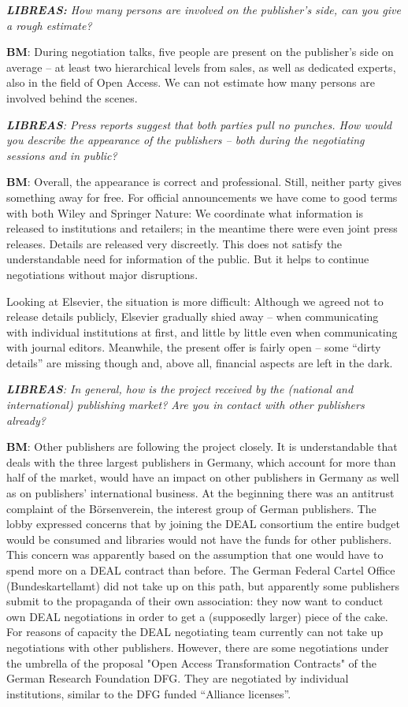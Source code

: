\documentclass[a4paper,
fontsize=11pt,
oneside,
numbers=noperiodatend,
parskip=half-,
bibliography=totoc,
final
]{scrartcl}
\begin{document}
\emph{\textbf{LIBREAS:} How many persons are involved on the publisher's
side, can you give a rough estimate?}

\textbf{BM}: During negotiation talks, five people are present on the
publisher's side on average -- at least two hierarchical levels from
sales, as well as dedicated experts, also in the field of Open Access.
We can not estimate how many persons are involved behind the scenes.

\emph{\textbf{LIBREAS}: Press reports suggest that both parties pull no
punches. How would you describe the appearance of the publishers -- both
during the negotiating sessions and in public?}

\textbf{BM}: Overall, the appearance is correct and professional. Still,
neither party gives something away for free. For official announcements
we have come to good terms with both Wiley and Springer Nature: We
coordinate what information is released to institutions and retailers;
in the meantime there were even joint press releases. Details are
released very discreetly. This does not satisfy the understandable need
for information of the public. But it helps to continue negotiations
without major disruptions.

Looking at Elsevier, the situation is more difficult: Although we agreed
not to release details publicly, Elsevier gradually shied away -- when
communicating with individual institutions at first, and little by
little even when communicating with journal editors. Meanwhile, the
present offer is fairly open -- some \enquote{dirty details} are missing
though and, above all, financial aspects are left in the dark.

\emph{\textbf{LIBREAS}: In general, how is the project received by the
(national and international) publishing market? Are you in contact with
other publishers already?}

\textbf{BM}: Other publishers are following the project closely. It is
understandable that deals with the three largest publishers in Germany,
which account for more than half of the market, would have an impact on
other publishers in Germany as well as on publishers' international
business. At the beginning there was an antitrust complaint of the
Börsenverein, the interest group of German publishers. The lobby
expressed concerns that by joining the DEAL consortium the entire budget
would be consumed and libraries would not have the funds for other
publishers. This concern was apparently based on the assumption that one
would have to spend more on a DEAL contract than before. The German
Federal Cartel Office (Bundeskartellamt) did not take up on this path,
but apparently some publishers submit to the propaganda of their own
association: they now want to conduct own DEAL negotiations in order to
get a (supposedly larger) piece of the cake. For reasons of capacity the
DEAL negotiating team currently can not take up negotiations with other
publishers. However, there are some negotiations under the umbrella of
the proposal "Open Access Transformation Contracts" of the German
Research Foundation DFG. They are negotiated by individual institutions,
similar to the DFG funded \enquote{Alliance licenses}.
\end{document}
